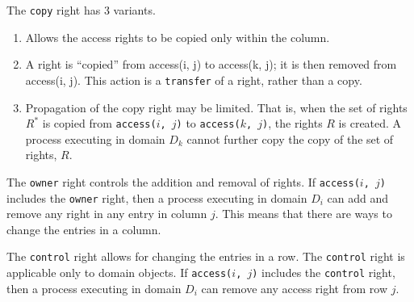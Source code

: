 The \texttt{copy} right has 3 variants.
\begin{enumerate}[noitemsep]
\item Allows the access rights to be copied only within the column.
\item A right is ``copied'' from access(i, j) to access(k, j); it is then removed from access(i, j).
  This action is a \texttt{transfer} of a right, rather than a copy.
\item Propagation of the copy right may be limited.
  That is, when the set of rights $R^{*}$ is copied from \texttt{access($i$, $j$)} to \texttt{access($k$, $j$)},  the rights $R$ is created.
  A process executing in domain $D_{k}$ cannot further copy the copy of the set of rights, $R$.
\end{enumerate}

The \texttt{owner} right controls the addition and removal of rights.
If \texttt{access($i$, $j$)} includes the \texttt{owner} right, then a process executing in domain $D_{i}$ can add and remove any right in any entry in column $j$.
This means that there are ways to change the entries in a column.

The \texttt{control} right allows for changing the entries in a row.
The \texttt{control} right is applicable only to domain objects.
If \texttt{access($i$, $j$)} includes the \texttt{control} right, then a process executing in domain $D_{i}$ can remove any access right from row $j$.


